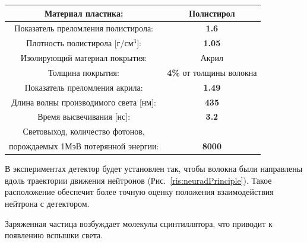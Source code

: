 {
	\centering
	\begin{tabular}{|c|c|}
		\hline
		Материал пластика: & Полистирол \\
		\hline
		Показатель преломления полистирола: & \textbf{1.6}  \\
		\hline
		Плотность полистирола [г/см$^3$]: & \textbf{1.05} \\
		\hline
		Изолирующий материал покрытия: & Акрил \\
		\hline
		Толщина покрытия: & \textbf{4\%} от толщины волокна  \\
		\hline
		Показатель преломления акрила: & \textbf{1.49} \\
		\hline
		Длина волны производимого света [нм]: & \textbf{435} \\
		\hline
		Время высвечивания [нс]: & \textbf{3.2} \\
		\hline
		Световыход, количество фотонов, & \\  
		порождаемых 1МэВ потерянной энергии: & \textbf{8000} \\
		\hline
	\end{tabular}
	\label{tab:bolts}
}

В экспериментах детектор будет установлен так, чтобы волокна были направлены вдоль траектории движения нейтронов (Рис.~\ref{ris:neuradPrinciple}). Такое расположение обеспечит более точную оценку положения взаимодействия нейтрона с детектором. 

Заряженная частица возбуждает молекулы сцинтиллятора, что приводит к появлению вспышки света.






